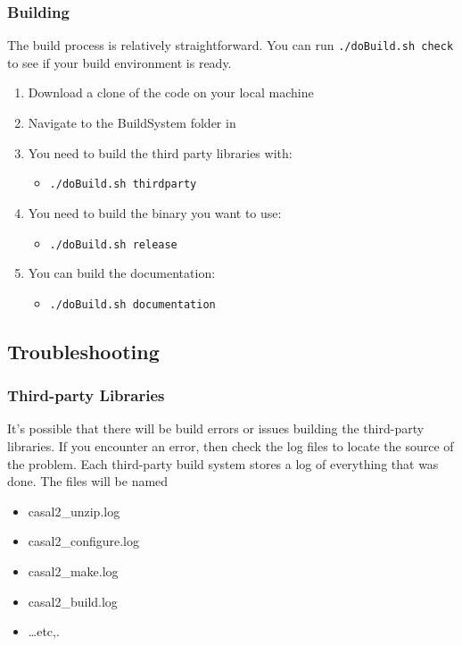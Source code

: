 \subsubsection{Building \CNAME}

The build process is relatively straightforward. You can run \texttt{./doBuild.sh check} to see if your build environment is ready.

\begin{enumerate}
	\item Download a clone of the code on your local machine
	\item Navigate to the BuildSystem folder in 
	\item You need to build the third party libraries with:
	\begin{itemize}
	    \item \texttt{./doBuild.sh thirdparty}
	\end{itemize}
	\item You need to build the binary you want to use:
	\begin{itemize}
		\item \texttt{./doBuild.sh release}
	\end{itemize}
	\item You can build the documentation:
	\begin{itemize}
		\item \texttt{./doBuild.sh documentation}
	\end{itemize}
\end{enumerate}

\subsection{Troubleshooting}

\subsubsection{Third-party Libraries}

It's possible that there will be build errors or issues building the third-party libraries. If you encounter an error, then check the log files to locate the source of the problem. Each third-party build system stores a log of everything that was done. The files will be named

\begin{itemize}
	\item casal2\_unzip.log
	\item casal2\_configure.log
	\item casal2\_make.log
	\item casal2\_build.log
	\item \dots etc,.
\end{itemize}


